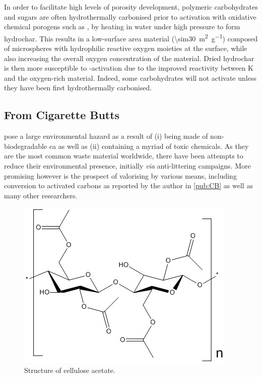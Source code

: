 In order to facilitate high levels of porosity development, polymeric carbohydrates and sugars are often hydrothermally carbonised prior to activation with oxidative chemical \glspl{porogen} such as , by heating in water under high pressure to form \gls{hydrochar}. This results in a low-surface area material (\qty{\sim30}{\metre\squared\per\gram}) composed of microspheres with hydrophilic reactive oxygen moieties at  the  surface, while also increasing the overall oxygen concentration of the material.\citep{Titirici2010Chemistry, Sevilla2011High} Dried \gls{hydrochar} is then more susceptible to -activation due to the improved reactivity between K and the oxygen-rich material.\citep{Sevilla2011High, Sevilla2009Chemical} Indeed, some carbohydrates will not activate unless they have been first hydrothermally carbonised.\citep{Ares2014}

\subsection{From Cigarette Butts}

 pose a large environmental hazard as a result of (i) being made of non-biodegradable \acrfull{ca} as well as (ii) containing a myriad of toxic chemicals.\citep{Slaughter2011, Puls2011, chevalier2018nano} As they are the most common waste material worldwide, there have been attempts to reduce their environmental presence, initially \textit{via} anti-littering campaigns.\citep{Prevention2011, Harris2011} More promising however is the prospect of valorising  by various means, including conversion to activated carbons as reported by the author in \ref{pub:CB} as well as many other researchers.\citep{Soltani, Soltani2013, lima2018, xiong2019nitrogen, Lee2014, Hamzah2017, Yu2018, Wang2016a, Koochaki2019, Bilge2019}

\begin{figure}[h]
    \centering
    \includegraphics[width=0.7\columnwidth, keepaspectratio]{4-cbs/figs/cellulose_acetate.jpg}
    \caption{Structure of cellulose acetate.}
    \label{fig:cellulose acetate}
\end{figure}

